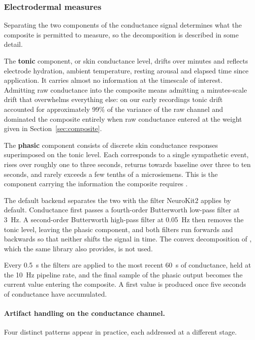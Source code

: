 \subsubsection{Electrodermal measures}
\label{sec:eda}

Separating the two components of the conductance signal
determines what the composite is permitted to measure, so the
decomposition is described in some detail.

The \textbf{tonic} component, or skin conductance level, drifts
over minutes and reflects electrode hydration, ambient
temperature, resting arousal and elapsed time since application.
It carries almost no information at the timescale of interest.
Admitting raw conductance into the composite means admitting a
minutes-scale drift that overwhelms everything else: on our
early recordings tonic drift accounted for approximately 99\% of
the variance of the raw channel and dominated the composite
entirely when raw conductance entered at the weight given in
Section~\ref{sec:composite}.

The \textbf{phasic} component consists of discrete skin
conductance responses superimposed on the tonic level. Each
corresponds to a single sympathetic event, rises over roughly one
to three seconds, returns towards baseline over three to ten
seconds, and rarely exceeds a few tenths of a microsiemens. This
is the component carrying the information the composite requires
\citep{boucsein2012, dawson2016, fowles1980}.

The default backend separates the two with the filter NeuroKit2
applies by default. Conductance first passes a fourth-order
Butterworth low-pass filter at 3~Hz. A second-order Butterworth
high-pass filter at 0.05~Hz then removes the tonic level, leaving
the phasic component, and both filters run forwards and backwards
so that neither shifts the signal in time. The convex
decomposition of \citet{greco2016}, which the same library also
provides, is not used.

Every 0.5~s the filters are applied to the most recent 60~s of
conductance, held at the 10~Hz pipeline rate, and the final sample
of the phasic output becomes the current value entering the
composite. A first value is produced once five seconds of
conductance have accumulated.

\paragraph{Artifact handling on the conductance channel.} Four
distinct patterns appear in practice, each addressed at a
different stage.

